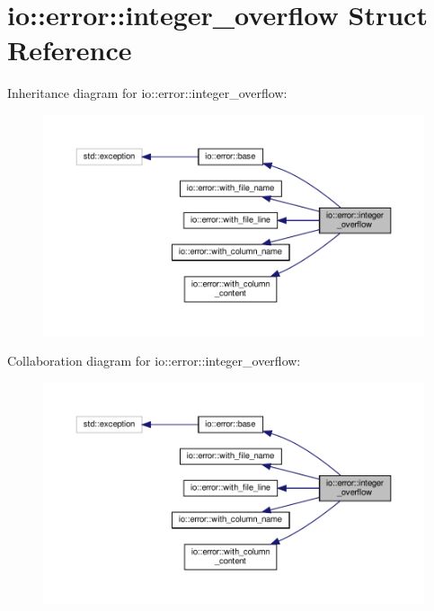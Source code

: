 \hypertarget{structio_1_1error_1_1integer__overflow}{}\section{io\+:\+:error\+:\+:integer\+\_\+overflow Struct Reference}
\label{structio_1_1error_1_1integer__overflow}


Inheritance diagram for io\+:\+:error\+:\+:integer\+\_\+overflow\+:\nopagebreak
\begin{figure}[H]
\begin{center}
\leavevmode
\includegraphics[width=350pt]{structio_1_1error_1_1integer__overflow__inherit__graph}
\end{center}
\end{figure}


Collaboration diagram for io\+:\+:error\+:\+:integer\+\_\+overflow\+:\nopagebreak
\begin{figure}[H]
\begin{center}
\leavevmode
\includegraphics[width=350pt]{structio_1_1error_1_1integer__overflow__coll__graph}
\end{center}
\end{figure}
